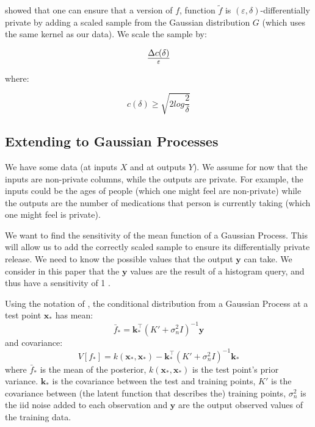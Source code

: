 \documentclass[a4paper]{article}
\begin{document}
\begin{multicols}{2}
\citet{hall2013differential} showed that one can ensure that a version of $f$, function $\widetilde{f}$ is $(\varepsilon, \delta)$-differentially private by adding a scaled sample from the Gaussian distribution $G$ (which uses the same kernel as our data). We scale the sample by:

$$\Delta c(\delta) \over \varepsilon$$

where:

$$c(\delta) \geq \sqrt{2 log \frac{2}{\delta}}$$

\subsection{Extending to Gaussian Processes}

We have some data (at inputs $X$ and at outputs $Y$). We assume for now that the inputs are non-private columns, while the outputs are private. For example, the inputs could be the ages of people (which one might feel are non-private) while the outputs are the number of medications that person is currently taking (which one might feel is private).

We want to find the sensitivity of the mean function of a Gaussian Process. This will allow us to add the correctly scaled sample to ensure its differentially private release. We need to know the possible values that the output $\bm{y}$ can take. We consider in this paper that the $\bm{y}$ values are the result of a histogram query, and thus have a sensitivity of 1 \citep{dwork2014algorithmic}.

Using the notation of \citet{williams2006gaussian}, the conditional distribution from a Gaussian Process at a test point $\bm{x}_*$ has mean:
\begin{equation}
\bar{f}_* = \bm{k}_*^\top \left( K' + \sigma_n^2 I \right)^{-1} \bm{y}
\label{gp_mean}
\end{equation}
and covariance:
\begin{equation}
V[{f}_*] = k(\bm{x}_*,\bm{x}_*) -  \bm{k}_*^\top \left( K' + \sigma_n^2 I \right)^{-1} \bm{k}_*
\label{gp_covar}
\end{equation}
where $\bar{f}_*$ is the mean of the posterior, $k(\bm{x}_*,\bm{x}_*)$ is the test point's prior variance. $\bm{k}_*$ is the covariance between the test and training points, $K'$ is the covariance between (the latent function that describes the) training points, $\sigma_n^2$ is the iid noise added to each observation and $\bm{y}$ are the output observed values of the training data.


\end{multicols}
\end{document}
